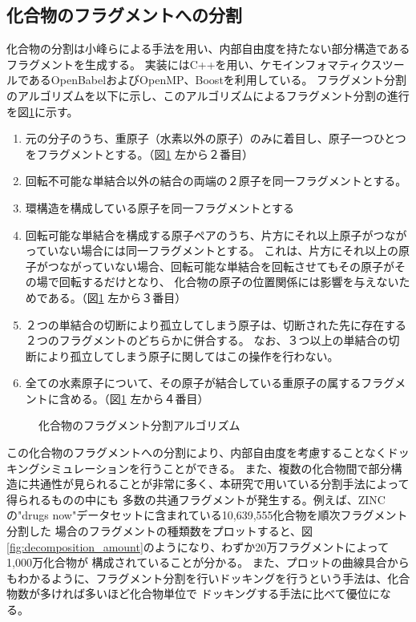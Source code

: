 \subsection{化合物のフラグメントへの分割}\label{subsec:decomposition}
化合物の分割は小峰らによる手法\cite{Shunta2015}を用い、内部自由度を持たない部分構造であるフラグメントを生成する。
実装にはC++を用い、ケモインフォマティクスツールであるOpenBabel\cite{OBoyle2011}およびOpenMP、Boostを利用している。
フラグメント分割のアルゴリズムを以下に示し、このアルゴリズムによるフラグメント分割の進行を図\ref{fig:decomposition}に示す。
\begin{enumerate} 
\item 元の分子のうち、重原子（水素以外の原子）のみに着目し、原子一つひとつをフラグメントとする。（図\ref{fig:decomposition} 左から２番目）
\item 回転不可能な単結合以外の結合の両端の２原子を同一フラグメントとする。
\item 環構造を構成している原子を同一フラグメントとする
\item 回転可能な単結合を構成する原子ペアのうち、片方にそれ以上原子がつながっていない場合には同一フラグメントとする。
	これは、片方にそれ以上の原子がつながっていない場合、回転可能な単結合を回転させてもその原子がその場で回転するだけとなり、
	化合物の原子の位置関係には影響を与えないためである。（図\ref{fig:decomposition} 左から３番目）
\item ２つの単結合の切断により孤立してしまう原子は、切断された先に存在する２つのフラグメントのどちらかに併合する。
	なお、３つ以上の単結合の切断により孤立してしまう原子に関してはこの操作を行わない。
\item 全ての水素原子について、その原子が結合している重原子の属するフラグメントに含める。（図\ref{fig:decomposition} 左から４番目）
\end{enumerate}

\begin{figure}[htp]
 \begin{center}
  \caption{化合物のフラグメント分割アルゴリズム\cite{Shunta2015}}
  \label{fig:decomposition}
 \end{center}
\end{figure}

この化合物のフラグメントへの分割により、内部自由度を考慮することなくドッキングシミュレーションを行うことができる。
また、複数の化合物間で部分構造に共通性が見られることが非常に多く、本研究で用いている分割手法によって得られるものの中にも
多数の共通フラグメントが発生する。例えば、ZINCの"drugs now"データセットに含まれている10,639,555化合物を順次フラグメント分割した
場合のフラグメントの種類数をプロットすると、図\ref{fig:decomposition_amount}のようになり、わずか20万フラグメントによって1,000万化合物が
構成されていることが分かる。
また、プロットの曲線具合からもわかるように、フラグメント分割を行いドッキングを行うという手法は、化合物数が多ければ多いほど化合物単位で
ドッキングする手法に比べて優位になる。

